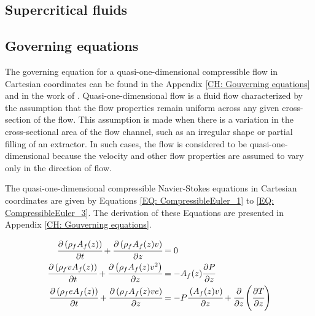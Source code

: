 \documentclass[a4paper,fleqn]{cas-dc}
\begin{document}
\subsection{Supercritical fluids} \label{CH: Thermodynamic}
%


%

\subsection{Governing equations} \label{CH:Governing_equations_chapter}
	The governing equation for a quasi-one-dimensional compressible flow in Cartesian coordinates can be found in the Appendix \ref{CH: Gouverning equations} and in the work of \citet{Anderson1995}. Quasi-one-dimensional flow is a fluid flow characterized by the assumption that the flow properties remain uniform across any given cross-section of the flow. This assumption is made when there is a variation in the cross-sectional area of the flow channel, such as an irregular shape or partial filling of an extractor. In such cases, the flow is considered to be quasi-one-dimensional because the velocity and other flow properties are assumed to vary only in the direction of flow.

The quasi-one-dimensional compressible Navier-Stokes equations in Cartesian coordinates are given by Equations \ref{EQ: CompressibleEuler_1} to \ref{EQ: CompressibleEuler_3}. The derivation of these Equations are presented in Appendix \ref{CH: Gouverning equations}.

{\footnotesize
	\begin{align}
		\label{EQ: CompressibleEuler_1}
		\cfrac{\partial \left( {\color{black}\rho_f} {\color{black}A_f}(z) \right) }{\partial t} + \cfrac{\partial \left( {\color{black}\rho_f} {\color{black}A_f}(z) v \right)}{\partial z} &= 0 \\
		\cfrac{\partial \left( {\color{black}\rho_f} v {\color{black}A_f}(z) \right) }{\partial t} + \cfrac{\partial \left( {\color{black}\rho_f} {\color{black}A_f}(z) v^2 \right)}{\partial z} &= -{\color{black}A_f}(z) \cfrac{\partial {\color{black}P}}{\partial z} \label{EQ: CompressibleEuler_2} \\
		\cfrac{\partial \left( {\color{black}\rho_f} {\color{black}e} {\color{black}A_f}(z) \right) }{\partial t} + \cfrac{\partial \left( {\color{black}\rho_f} {\color{black}A_f}(z) v {\color{black}e}\right)}{\partial z} &= -{\color{black}P}\cfrac{\left( {\color{black}A_f}(z) v \right)}{\partial z} + \cfrac{\partial}{\partial z} \left( \cfrac{\partial {\color{black}T}}{\partial z} \right)   
		\label{EQ: CompressibleEuler_3}
	\end{align}  
}
\end{document}
